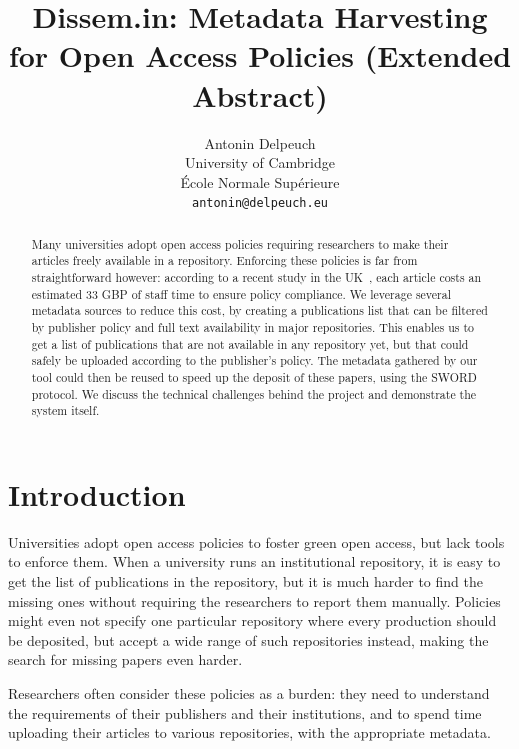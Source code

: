 \documentclass[a4paper]{article}
\begin{document}
\title{Dissem.in: Metadata Harvesting for Open Access Policies (Extended Abstract)}
\author{Antonin Delpeuch \\
University of Cambridge \\
École Normale Supérieure \\
\texttt{antonin@delpeuch.eu}}

\maketitle

\begin{abstract}
Many universities adopt open access policies requiring researchers to make their articles freely
available in a repository. Enforcing these policies is far from straightforward however: according to
a recent study in the UK~\cite{research2014counting},
each article costs an estimated 33 GBP of staff time to ensure policy
compliance. We leverage several metadata sources to reduce this cost,
by creating a publications list that can be filtered by publisher policy and full text availability in
major repositories. This enables us to get a list of publications that are not available in any
repository yet, but that could safely be uploaded according to the publisher's policy. The
metadata gathered by our tool could then be reused to speed up the deposit of these papers,
using the SWORD protocol.
We discuss the technical challenges behind the project and demonstrate the system itself.
\end{abstract}

\section{Introduction}

Universities adopt open access policies to foster green open
access, but lack tools to enforce them. When a university runs an
institutional repository, it is easy to get the list of publications in
the repository, but it is much harder to find the missing ones without
requiring the researchers to report them manually. Policies might even
not specify one particular repository where every production should be
deposited, but accept a wide range of such repositories instead, making the
search for missing papers even harder.

Researchers often consider these policies as a burden: they need to
understand the requirements of their publishers and their institutions,
and to spend time uploading their articles to various repositories, with
the appropriate metadata.
\end{document}
